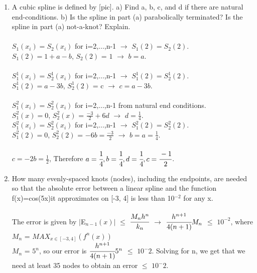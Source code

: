 \documentclass[12pt]{article}
\begin{document}
\begin{enumerate}
	\item A cubic spline is defined by [pic]. a) Find a, b, c, and d if there are natural end-conditions. b) Is the spline in part (a) parabolically terminated? Is the spline in part (a) not-a-knot? Explain. \\ \\
	
	
	$S_1(x_i) = S_2(x_i)$ for i=2,...,n-1 $\rightarrow$ $S_1(2) = S_2(2)$. \\
	$S_1(2) = 1+a-b$, $S_2(2)$ = $1$ $\rightarrow$ $b=a$. \\ \\
	
	$S^1_1(x_i) = S^1_2(x_i)$ for i=2,...,n-1 $\rightarrow$ $S^1_1(2) = S^1_2(2)$. \\
	$S^1_1(2) = a-3b$, $S^1_2(2)$ = c $\rightarrow$ $c = a-3b$. \\ \\
	
	$S^2_1(x_i) = S^2_2(x_i)$ for i=2,...,n-1 from natural end conditions. \\
	$S^2_1(x) = 0$, $S^2_2(x)$ = $\frac{-3}{2} + 6d$ $\rightarrow$ $d = \frac{1}{4}$. \\ 
	
	$S^2_1(x_i) = S^2_2(x_i)$ for i=2,...,n-1 $\rightarrow$ $S^2_1(2) = S^2_2(2)$. \\
	$S^2_1(2) = 0$, $S^2_2(2)$ = $-6b = \frac{-3}{2}$ $\rightarrow$ $b=a=\frac{1}{4}$. \\ \\
	$c = -2b = \frac{1}{2}$, Therefore $a = \cfrac{1}{4}, b = \cfrac{1}{4}, d = \cfrac{1}{4}, c = \cfrac{-1}{2}$. \\
	
	\item How many evenly-spaced knots (nodes), including the endpoints, are needed so that the absolute error between a linear spline and the function f(x)=cos(5x)it approximates on [-3, 4] is less than 10$^{-2}$ for any x. \\ \\
	The error is given by $|$E$_{n-1}(x)|$ $\leq$ $\cfrac{M_nh^n}{k_n}$ $\rightarrow$ $\cfrac{h^{n+1}}{4(n+1)}M_n$ $\leq$ $10^{-2}$, where $M_n$ = $MAX_{x \in [-3, 4]}(f^n(x))$ \\
	$M_n$ = $5^n$, so our error is $\cfrac{h^{n+1}}{4(n+1)}5^n$ $\leq$ $10^-2$. Solving for n, we get that we need at least 35 nodes to obtain an error $\leq$ $10^-2$.




\end{enumerate}
\end{document}
